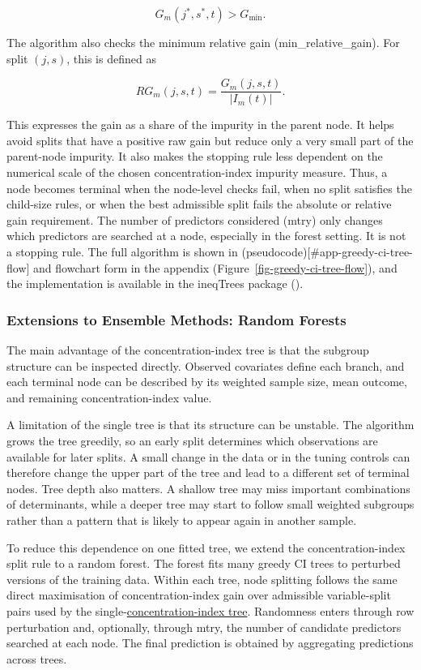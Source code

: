 \documentclass[
  11pt,
  a4paper,
]{article}
\begin{document}
\[
G_m(j^*,s^*,t) > G_{\mathrm{min}}.
\]

The algorithm also checks the minimum relative gain
(min\_relative\_gain). For split \((j,s)\), this is defined as

\[
RG_m(j,s,t)
=
\frac{G_m(j,s,t)}{|I_m(t)|}.
\]

This expresses the gain as a share of the impurity in the parent node.
It helps avoid splits that have a positive raw gain but reduce only a
very small part of the parent-node impurity. It also makes the stopping
rule less dependent on the numerical scale of the chosen
concentration-index impurity measure. Thus, a node becomes terminal when
the node-level checks fail, when no split satisfies the child-size
rules, or when the best admissible split fails the absolute or relative
gain requirement. The number of predictors considered (mtry) only
changes which predictors are searched at a node, especially in the
forest setting. It is not a stopping rule. The full algorithm is shown
in (pseudocode){[}\#app-greedy-ci-tree-flow{]} and flowchart form in the
appendix (Figure~\ref{fig-greedy-ci-tree-flow}), and the implementation
is available in the ineqTrees package ().

\subsubsection{Extensions to Ensemble Methods: Random
Forests}\label{sec-random-forests}

The main advantage of the concentration-index tree is that the subgroup
structure can be inspected directly. Observed covariates define each
branch, and each terminal node can be described by its weighted sample
size, mean outcome, and remaining concentration-index value.

A limitation of the single tree is that its structure can be unstable.
The algorithm grows the tree greedily, so an early split determines
which observations are available for later splits. A small change in the
data or in the tuning controls can therefore change the upper part of
the tree and lead to a different set of terminal nodes. Tree depth also
matters. A shallow tree may miss important combinations of determinants,
while a deeper tree may start to follow small weighted subgroups rather
than a pattern that is likely to appear again in another sample.

To reduce this dependence on one fitted tree, we extend the
concentration-index split rule to a random forest. The forest fits many
greedy CI trees to perturbed versions of the training data. Within each
tree, node splitting follows the same direct maximisation of
concentration-index gain over admissible variable-split pairs used by
the single-\hyperref[sec-algorithmic-summary]{concentration-index tree}.
Randomness enters through row perturbation and, optionally, through
mtry, the number of candidate predictors searched at each node. The
final prediction is obtained by aggregating predictions across trees.
\end{document}
